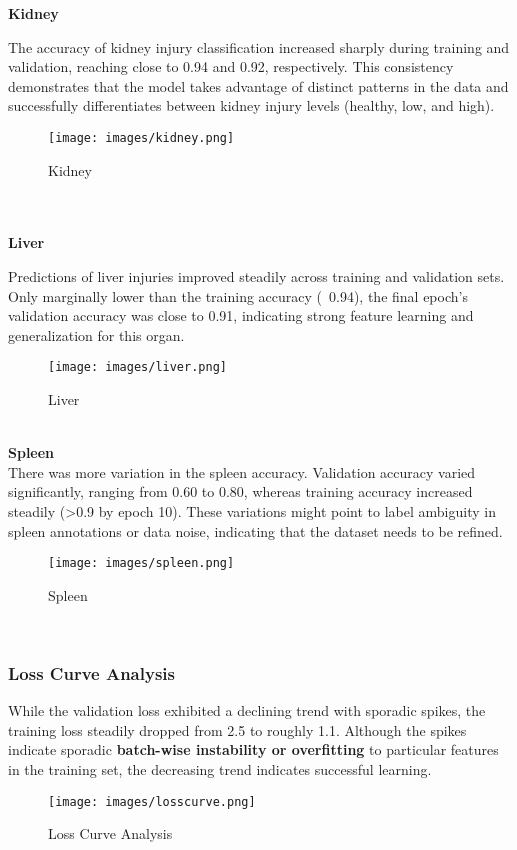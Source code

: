 \documentclass[a4paper,12pt]{article}
\begin{document}
\textbf{Kidney}

The accuracy of kidney injury classification increased sharply during training and validation, reaching close to 0.94 and 0.92, respectively. This consistency demonstrates that the model takes advantage of distinct patterns in the data and successfully differentiates between kidney injury levels (healthy, low, and high).
\\
\begin{figure}[!htbp]
    \centering
    \texttt{[image: images/kidney.png]}
    \caption{Kidney}
    \label{fig:dv_meth}
\end{figure}
\\
\\

\textbf{Liver}

Predictions of liver injuries improved steadily across training and validation sets. Only marginally lower than the training accuracy (~0.94), the final epoch's validation accuracy was close to 0.91, indicating strong feature learning and generalization for this organ.
\\
\begin{figure}[!htbp]
    \centering
    \texttt{[image: images/liver.png]}
    \caption{Liver}
    \label{fig:dv_meth}
\end{figure}
\\

\textbf{Spleen}
\\
There was more variation in the spleen accuracy. Validation accuracy varied significantly, ranging from 0.60 to 0.80, whereas training accuracy increased steadily (>0.9 by epoch 10). These variations might point to label ambiguity in spleen annotations or data noise, indicating that the dataset needs to be refined.
\begin{figure}[!htbp]
    \centering
    \texttt{[image: images/spleen.png]}
    \caption{Spleen}
    \label{fig:dv_meth}
\end{figure}
\\

\subsubsection{Loss Curve Analysis}
While the validation loss exhibited a declining trend with sporadic spikes, the training loss steadily dropped from 2.5 to roughly 1.1. Although the spikes indicate sporadic \textbf{batch-wise instability or overfitting} to particular features in the training set, the decreasing trend indicates successful learning.
\begin{figure}[!htbp]
    \centering
    \texttt{[image: images/losscurve.png]}
    \caption{Loss Curve Analysis}
    \label{fig:dv_meth}
\end{figure}
\\
\end{document}
